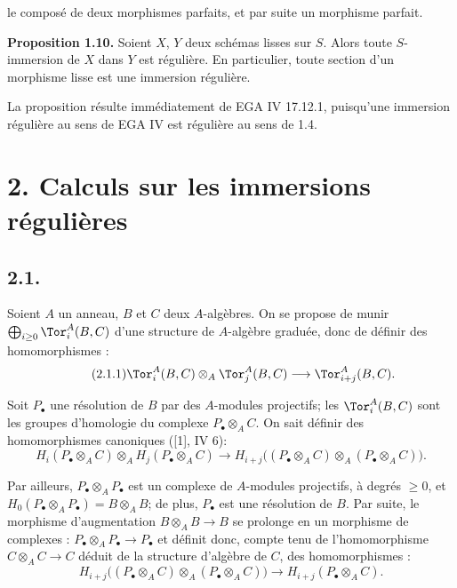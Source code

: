 le composé de deux morphismes parfaits, et par suite un morphisme parfait.

\textbf{Proposition 1.10.} Soient \(X\), \(Y\) deux schémas lisses sur \(S\). Alors toute \(S\)-immersion de \(X\) dans \(Y\) est régulière. En particulier, toute section d'un morphisme lisse est une immersion régulière.

La proposition résulte immédiatement de EGA IV 17.12.1, puisqu'une immersion régulière au sens de EGA IV est régulière au sens de 1.4.

\section*{2. Calculs sur les immersions régulières}

\subsection*{2.1.}
Soient \(A\) un anneau, \(B\) et \(C\) deux \(A\)-algèbres. On se propose de munir \(\bigoplus_{i\ge0}\Tor_i^A(B,C)\) d'une structure de \(A\)-algèbre graduée, donc de définir des homomorphismes :
\begin{equation}\tag{2.1.1}
 \Tor_i^A(B,C)\otimes_A\Tor_j^A(B,C)\longrightarrow \Tor_{i+j}^A(B,C).
\end{equation}

Soit \(P_\bullet\) une résolution de \(B\) par des \(A\)-modules projectifs; les \(\Tor_i^A(B,C)\) sont les groupes d'homologie du complexe \(P_\bullet\otimes_A C\). On sait définir des homomorphismes canoniques ([1], IV 6):
\begin{equation}\tag{2.1.2}
 H_i(P_\bullet\otimes_A C)\otimes_A H_j(P_\bullet\otimes_A C)
 \longrightarrow H_{i+j}\bigl((P_\bullet\otimes_A C)\otimes_A(P_\bullet\otimes_A C)\bigr).
\end{equation}

Par ailleurs, \(P_\bullet\otimes_A P_\bullet\) est un complexe de \(A\)-modules projectifs, à degrés \(\geq0\), et \(H_0(P_\bullet\otimes_A P_\bullet)=B\otimes_A B\); de plus, \(P_\bullet\) est une résolution de \(B\). Par suite, le morphisme d'augmentation \(B\otimes_A B\to B\) se prolonge en un morphisme de complexes : \(P_\bullet\otimes_A P_\bullet\to P_\bullet\) et définit donc, compte tenu de l'homomorphisme \(C\otimes_A C\to C\) déduit de la structure d'algèbre de \(C\), des homomorphismes :
\begin{equation}\tag{2.1.3}
 H_{i+j}\bigl((P_\bullet\otimes_A C)\otimes_A(P_\bullet\otimes_A C)\bigr)
 \longrightarrow H_{i+j}(P_\bullet\otimes_A C).
\end{equation}
